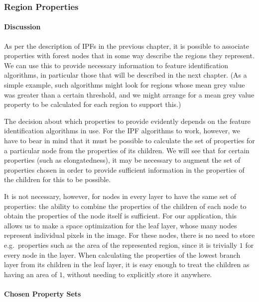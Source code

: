 \subsubsection{Region Properties}

\paragraph{Discussion}

As per the description of IPFs in the previous chapter, it is possible to associate properties with forest nodes that in some way describe the regions they represent. We can use this to provide necessary information to feature identification algorithms, in particular those that will be described in the next chapter. (As a simple example, such algorithms might look for regions whose mean grey value was greater than a certain threshold, and we might arrange for a mean grey value property to be calculated for each region to support this.)

The decision about which properties to provide evidently depends on the feature identification algorithms in use. For the IPF algorithms to work, however, we have to bear in mind that it must be possible to calculate the set of properties for a particular node from the properties of its children. We will see that for certain properties (such as elongatedness), it may be necessary to augment the set of properties chosen in order to provide sufficient information in the properties of the children for this to be possible.

It is not necessary, however, for nodes in every layer to have the same set of properties: the ability to combine the properties of the children of each node to obtain the properties of the node itself is sufficient. For our application, this allows us to make a space optimization for the leaf layer, whose many nodes represent individual pixels in the image. For these nodes, there is no need to store e.g.~properties such as the area of the represented region, since it is trivially $1$ for every node in the layer. When calculating the properties of the lowest branch layer from its children in the leaf layer, it is easy enough to treat the children as having an area of $1$, without needing to explicitly store it anywhere.

\paragraph{Chosen Property Sets}

